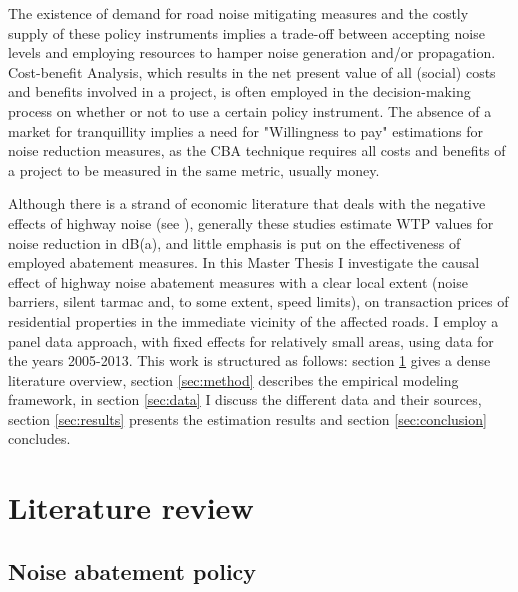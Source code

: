 \documentclass[12pt,a4paper]{scrartcl}
\begin{document}
	The existence of demand for road noise mitigating measures and the costly supply of these policy instruments implies a trade-off between accepting noise levels and employing resources to hamper noise generation and/or propagation. Cost-benefit Analysis, which results in the net present value of all (social) costs and benefits involved in a project, is often employed in the decision-making process on whether or not to use a certain policy instrument. The absence of a market for tranquillity implies a need for "Willingness to pay" estimations for noise reduction measures, as the CBA technique requires all costs and benefits of a project to be measured in the same metric, usually money.
	
	Although there is a strand of economic literature that deals with the negative effects of highway noise (see \cite{Nelson1982,Nelson2008,Bateman2001}), generally these studies estimate WTP values for noise reduction in dB(a), and little emphasis is put on the effectiveness of employed abatement measures. In this Master Thesis I investigate the causal effect of highway noise abatement measures with a clear local extent (noise barriers, silent tarmac and, to some extent, speed limits), on transaction prices of residential properties in the immediate vicinity of the affected roads. I employ a panel data approach, with fixed effects for relatively small areas, using data for the years 2005-2013. This work is structured as follows: section \ref{sec:litrev} gives a dense literature overview, section \ref{sec:method} describes the empirical modeling framework, in section \ref{sec:data} I discuss the different data and their sources, section \ref{sec:results} presents the estimation results and section \ref{sec:conclusion} concludes.
	
	\section{Literature review}
	\label{sec:litrev}
		
		\subsection{Noise abatement policy}	
	
\end{document}

